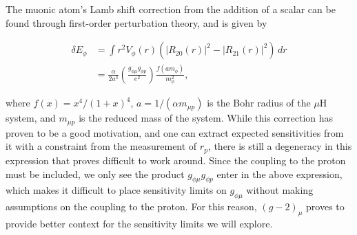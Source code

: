 The muonic atom's Lamb shift correction from the addition of a scalar can be found through first-order perturbation theory, and is given by \cite{TuckerSmith:2010ra, Carlson:2015jba}

\begin{align}
    \delta E_\phi &= \int r^2 V_\phi(r)\left(\left|R_{20}(r)\right|^2 - \left|R_{21}(r)\right|^2\right)\,dr \\
                  &= \frac{\alpha}{2 a^3} \left(\frac{g_{\phi\mu} g_{\phi p}}{e^2}\right) \frac{f(a m_\phi)}{m_\phi^2} \textrm{,}
\end{align}

\noindent where $f(x) = x^4/(1+x)^4$, $a = 1/(\alpha m_{\mu p})$ is the Bohr radius of the $\mu\textrm{H}$ system, and $m_{\mu p}$ is the reduced mass of the system.
While this correction has proven to be a good motivation, and one can extract expected sensitivities from it with a constraint from the measurement of $r_p$, there is still a degeneracy in this expression that proves difficult to work around.
Since the coupling to the proton must be included, we only see the product $g_{\phi\mu} g_{\phi p}$ enter in the above expression, which makes it difficult to place sensitivity limits on $g_{\phi\mu}$ without making assumptions on the coupling to the proton.
For this reason, $(g-2)_\mu$ proves to provide better context for the sensitivity limits we will explore.
